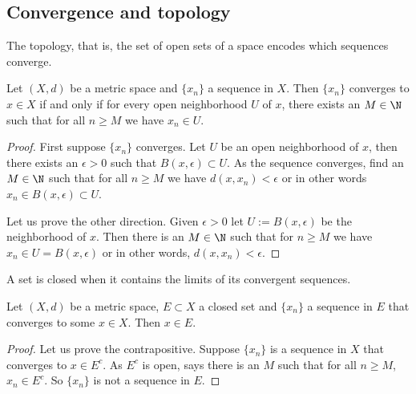 \documentclass[12pt]{book}
\begin{document}
\subsection*{Convergence and topology}

The topology, that is, the set of open sets of a space encodes which
sequences converge.

\begin{prop} \label{prop:msconvtopo}
Let $(X,d)$ be a metric space and $\{x_n\}$ a sequence in $X$.
Then
$\{ x_n \}$ converges to $x \in X$ if and only if for every open neighborhood
$U$ of $x$, there exists an $M \in \N$ such that for all $n \geq M$
we have $x_n \in U$.
\end{prop}

\begin{proof}
First suppose $\{ x_n \}$ converges.
Let $U$ be an open neighborhood
of $x$, then there exists an $\epsilon > 0$ such that $B(x,\epsilon) \subset
U$.
As the sequence converges, find an $M \in \N$ such that for all $n \geq
M$ we have $d(x,x_n) < \epsilon$ or in other words $x_n \in B(x,\epsilon)
\subset U$.

Let us prove the other direction.
Given $\epsilon > 0$ let $U :=
B(x,\epsilon)$ be the neighborhood of $x$.
Then there is an $M \in \N$
such that for $n \geq M$ we have $x_n \in U = B(x,\epsilon)$ or in other
words, $d(x,x_n) < \epsilon$.
\end{proof}

A set is closed when it contains the limits of its convergent sequences.

\begin{prop} \label{prop:msclosedlim}
Let $(X,d)$ be a metric space, $E \subset X$ a closed set
and $\{ x_n \}$ a sequence in $E$ that converges to some $x \in X$.
Then $x \in E$.
\end{prop}

\begin{proof}
Let us prove the contrapositive.
Suppose $\{ x_n \}$ is a sequence in $X$ that converges to $x \in E^c$.
As $E^c$ is open,  says there is
an $M$ such that for all $n \geq M$,
$x_n \in E^c$.
So $\{ x_n \}$  is not a sequence in $E$.
\end{proof}
\end{document}

